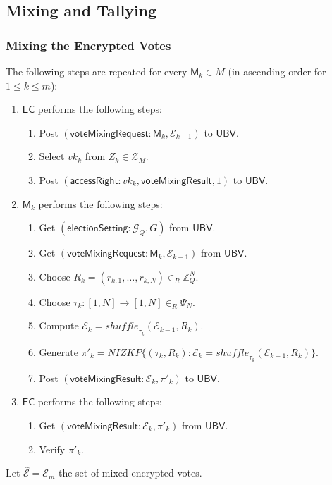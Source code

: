 \documentclass[bibtotoc,halfparskip,oneside]{scrreprt}
\newcommand{\vk}[1]{\mathit{vk}_{#1}\xspace}
\newcommand{\EC}{\ensuremath{\mathsf{EC}}\xspace}
\newcommand{\UBV}{\ensuremath{\mathsf{UBV}}\xspace}
\newcommand{\Mixer}[1]{\ensuremath{\mathsf{M}_{#1}}\xspace}
\begin{document}
\subsection{Mixing and Tallying}

\subsubsection{Mixing the Encrypted Votes}

The following steps are repeated for every $\Mixer{k}\in M$ (in ascending order for $1\leq k\leq m$):
\begin{enumerate}
	\item \EC performs the following steps:
	\begin{enumerate}
		\item Post $(\mathsf{voteMixingRequest}:\Mixer{k},\mathcal{E}_{k-1})$ to \UBV.
		\item Select $\vk{k}$ from $Z_{k}\in \mathcal{Z}_{M}$.
		\item Post $(\mathsf{accessRight}:\vk{k},\mathsf{voteMixingResult},1)$ to \UBV.
	\end{enumerate}
	\item $\Mixer{k}$ performs the following steps:
	\begin{enumerate}
		\item Get $(\mathsf{electionSetting}:\mathcal{G}_Q,G)$ from \UBV.
		\item Get $(\mathsf{voteMixingRequest}:\Mixer{k}, \mathcal{E}_{k-1})$ from \UBV.
		\item Choose $R_k=(r_{k,1},\ldots,r_{k,N})\in_R\mathbb{Z}_Q^N$.
		\item Choose $\tau_k:[1,N]\rightarrow[1,N]\in_R\Psi_N$.
		\item Compute $\mathcal{E}_k=\mathit{shuffle}_{\tau_k}(\mathcal{E}_{k-1},R_k)$.
		\item Generate $\pi'_{k}=\mathit{NIZKP}\{(\tau_k,R_k): \mathcal{E}_k=\mathit{shuffle}_{\tau_k}(\mathcal{E}_{k-1},R_k)\}$.
		\item Post $(\mathsf{voteMixingResult}:\mathcal{E}_k,\pi'_{k})$ to \UBV.
	\end{enumerate}
	\item \EC performs the following steps:
	\begin{enumerate}
		\item Get $(\mathsf{voteMixingResult}:\mathcal{E}_k,\pi'_{k})$ from \UBV.
		\item Verify $\pi'_{k}$.
	\end{enumerate}
\end{enumerate}
Let $\hat{\mathcal{E}}=\mathcal{E}_m$ the set of mixed encrypted votes. 
\end{document}
